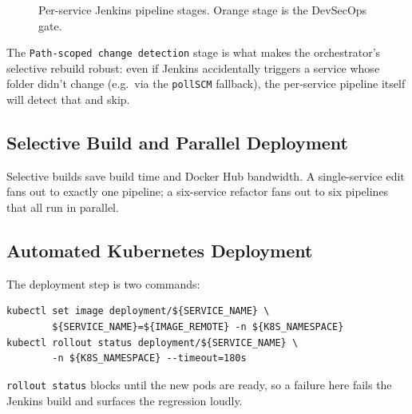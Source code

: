 \documentclass[11pt,a4paper]{article}
\begin{document}
\begin{figure}[h]
\centering
{}
\caption{Per-service Jenkins pipeline stages.  Orange stage is the
DevSecOps gate.}
\label{fig:per-service}
\end{figure}

The \texttt{Path-scoped change detection} stage is what makes the
orchestrator's selective rebuild robust: even if Jenkins
accidentally triggers a service whose folder didn't change (e.g.\
via the \texttt{pollSCM} fallback), the per-service pipeline itself
will detect that and skip.

\subsection{Selective Build and Parallel Deployment}
Selective builds save build time and Docker Hub bandwidth.  A
single-service edit fans out to exactly one pipeline; a six-service
refactor fans out to six pipelines that all run in parallel.

\subsection{Automated Kubernetes Deployment}
The deployment step is two commands:

\begin{lstlisting}
kubectl set image deployment/${SERVICE_NAME} \
        ${SERVICE_NAME}=${IMAGE_REMOTE} -n ${K8S_NAMESPACE}
kubectl rollout status deployment/${SERVICE_NAME} \
        -n ${K8S_NAMESPACE} --timeout=180s
\end{lstlisting}

\texttt{rollout status} blocks until the new pods are ready, so a
failure here fails the Jenkins build and surfaces the regression
loudly.
\end{document}

